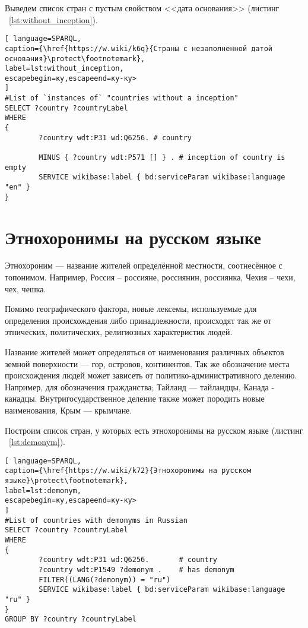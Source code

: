 Выведем список стран с пустым свойством <<дата основания>> (листинг ~\ref{lst:without_inception}).

\begin{lstlisting}[ language=SPARQL, 
caption={\href{https://w.wiki/k6q}{Страны с незаполненной датой основания}\protect\footnotemark},
label=lst:without_inception, 
escapebegin=ку,escapeend=ку-ку>
]
#List of `instances of` "countries without a inception" 
SELECT ?country ?countryLabel 
WHERE
{
		?country wdt:P31 wd:Q6256. # country
		
		MINUS { ?country wdt:P571 [] } . # inception of country is empty
		SERVICE wikibase:label { bd:serviceParam wikibase:language "en" }
}
\end{lstlisting}


\section{Этнохоронимы на русском языке}

Этнохороним — название жителей определённой местности, соотнесённое с топонимом. Например, Россия – россияне, россиянин, россиянка, Чехия – чехи, чех, чешка.

Помимо географического фактора, новые лексемы, используемые для определения происхождения либо принадлежности, происходят так же от этнических, политических, религиозных характеристик людей\cite{features_of_katoikonyms}. 

Название жителей может определяться от наименования различных объектов земной поверхности — гор, островов, континентов. Так же обозначение места происхождения людей может зависеть от политико-административного делению. Например, для обозначения гражданства; Тайланд — тайландцы, Канада - канадцы. Внутригосударственное деление также может породить новые наименования, Крым — крымчане.

Построим список стран, у которых есть этнохоронимы на русском языке (листинг ~\ref{lst:demonym}).


\begin{lstlisting}[ language=SPARQL, 
caption={\href{https://w.wiki/k72}{Этнохоронимы на русском языке}\protect\footnotemark},
label=lst:demonym, 
escapebegin=ку,escapeend=ку-ку>
]
#List of countries with demonyms in Russian
SELECT ?country ?countryLabel 
WHERE
{
		?country wdt:P31 wd:Q6256.       # country
		?country wdt:P1549 ?demonym .    # has demonym
		FILTER((LANG(?demonym)) = "ru")
		SERVICE wikibase:label { bd:serviceParam wikibase:language "ru" }
}
GROUP BY ?country ?countryLabel
\end{lstlisting}

